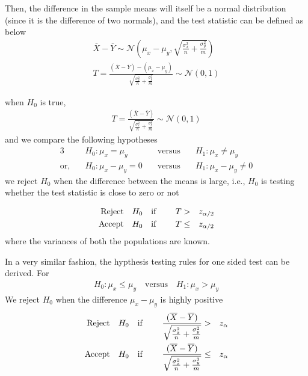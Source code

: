 \documentclass[../probability-notes.tex]{subfiles}
\begin{document}
    Then, the difference in the sample means will itself be a normal distribution (since it is the difference of two normals), and the test statistic can be defined as below
    \begin{align*}
        \overline{X} - \overline{Y} \sim \mathcal{N}(\mu_{x} - \mu_{y}, \sqrt{\frac{\sigma_{x}^{2}}{n} + \frac{\sigma_{y}^{2}}{m}})\\
        T = \frac{(\overline{X} - \overline{Y}) - (\mu_{x} - \mu_{y})}{\sqrt{\frac{\sigma_{x}^{2}}{n} + \frac{\sigma_{y}^{2}}{m}}} \sim \mathcal{N}(0, 1)
    \end{align*}

    when $H_{0}$ is true,
    \begin{align*}
        T = \frac{(\overline{X} - \overline{Y})}{\sqrt{\frac{\sigma_{x}^{2}}{n} + \frac{\sigma_{y}^{2}}{m}}} \sim \mathcal{N}(0, 1)
    \end{align*}
    and we compare the following hypotheses
    \begin{alignat*}{3}
        &H_{0}: \mu_{x} = \mu_{y} \quad &\text{versus} \quad &H_{1}: \mu_{x} \neq \mu_{y}\\
        \text{or,} \quad &H_{0}: \mu_{x} - \mu_{y} = 0 \quad &\text{versus} \quad &H_{1}: \mu_{x} - \mu_{y} \neq 0
    \end{alignat*}
    we reject $H_{0}$ when the difference between the means is large, i.e., $H_{0}$ is testing whether the test statistic is close to zero or not

    \begin{alignat*}{4}
        \text{Reject\quad} &H_{0} \text{\quad if \quad} &T &> &z_{\alpha/2}\\
        \text{Accept\quad} &H_{0} \text{\quad if\quad} &T &\leq &z_{\alpha/2}
    \end{alignat*}
    where the variances of both the populations are known.\newline

    In a very similar fashion, the hypthesis testing rules for one sided test can be derived.\newline
    For
    \begin{align*}
        H_{0}: \mu_{x} \leq \mu_{y} \quad \text{versus} \quad H_{1}: \mu_{x} > \mu_{y}
    \end{align*}
    We reject $H_{0}$ when the difference $\mu_{x} - \mu_{y}$ is highly positive
    \begin{alignat*}{4}
        \text{Reject\quad} &H_{0} \text{\quad if \quad} &\frac{(\overline{X} - \overline{Y})}{\sqrt{\frac{\sigma_{x}^{2}}{n} + \frac{\sigma_{y}^{2}}{m}}} &> &z_{\alpha}\\
        \text{Accept\quad} &H_{0} \text{\quad if\quad} &\frac{(\overline{X} - \overline{Y})}{\sqrt{\frac{\sigma_{x}^{2}}{n} + \frac{\sigma_{y}^{2}}{m}}} &\leq &z_{\alpha}
    \end{alignat*}
\end{document}
